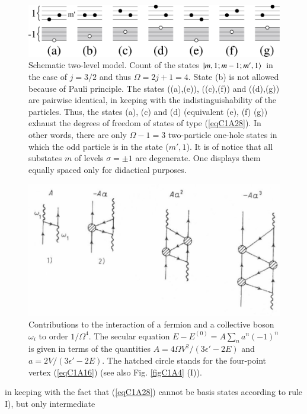   \begin{figure}
 	\centerline {
 		\includegraphics*[width=13cm]{introduccion/figs/figalpha}
 	}
 	\caption[Schematic two-level model.]{Schematic two-level model. Count of the states $|{m,1;m-1;m',1} \rangle$ in the case of $j=3/2$ and thus $\Omega=2j+1=4$. State (b) is not allowed because of Pauli principle. The states ((a),(e)), ((c),(f)) and ((d),(g)) are pairwise identical, in keeping with the indistinguishability of the particles. Thus, the states (a), (c) and (d) (equivalent (e), (f) (g)) exhaust the degrees of freedom of states of type (\ref{eqC1A28}). In other words, there are only $\Omega-1=3$ two-particle one-hole states in which the odd particle is in the state ($m',1$). It is of notice that all substates $m$ of levels $\sigma=\pm1$ are degenerate. One displays them equally spaced only for didactical purposes.}
 	\label{figalpha}
 \end{figure}
  \begin{figure}
  \centerline {
  \includegraphics*[width=12cm]{introduccion/figs/fig19}
  }
  \caption[Contributions to the interaction of a fermion and a collective boson $\omega_i$ to order $1/\Omega^4$.]{Contributions to the interaction of a fermion and a collective boson $\omega_i$ to order $1/\Omega^4$. The secular equation $E-E^{(0)}=A\sum_na^n(-1)^n$ is given in terms of the quantities $A=4\Omega V^2/(3\epsilon'-2E)$ and $a=2V/(3\epsilon'-2E)$. The hatched circle stands for the four-point vertex (\ref{eqC1A16}) (see also Fig. \ref{figC1A4} (I)).}
  \label{figC1A2}
  \end{figure}
in keeping with the fact that (\ref{eqC1A28}) cannot be basis states according to rule I), but only intermediate
